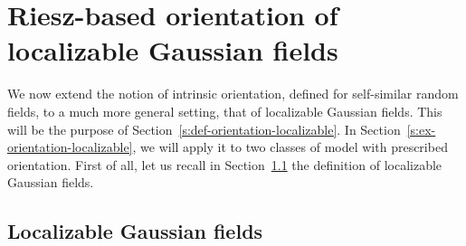 \documentclass{elsarticle}
\begin{document}
\section{Riesz-based orientation of localizable Gaussian fields}\label{s:wav:based:orientation:loc}

We now extend the notion of intrinsic orientation, defined for self-similar random fields, to a much more general setting, that of localizable Gaussian fields. This will be the purpose of Section~\ref{s:def-orientation-localizable}. In Section~\ref{s:ex-orientation-localizable}, we will apply it to two classes of model with prescribed orientation. First of all, let us recall in Section~\ref{s:localizable} the definition of localizable Gaussian fields.
%
\subsection{Localizable Gaussian fields}
\label{s:localizable}
\end{document}
